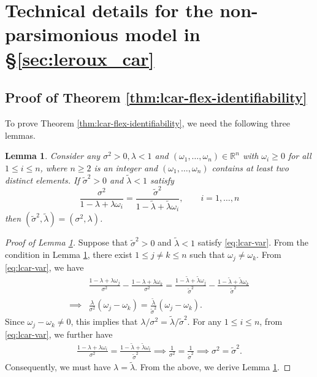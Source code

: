 \documentclass[11pt]{article}
\newtheorem{lemma}{Lemma}
\theoremstyle{definition}
\theoremstyle{remark}
\begin{document}
\section{Technical details for the non-parsimonious model in \S \ref{sec:leroux_car}}\label{sec:proofs-lcar-nonpars}

\subsection{Proof of Theorem \ref{thm:lcar-flex-identifiability}}

To prove Theorem \ref{thm:lcar-flex-identifiability}, we need the following three lemmas. 

\begin{lemma}\label{lem:lcar-varz}
Consider any $\sigma^2 >0, \lambda < 1$ and $(\omega_1,\ldots,\omega_n) \in \mathbb{R}^n$ with $\omega_i \ge 0$ for all $1 \le i \le n$, where $n\ge 2$ is an integer and $(\omega_1,\ldots,\omega_n)$ contains at least two distinct elements. If $\tilde{\sigma}^2 >0$ and $\tilde{\lambda} < 1$ satisfy
\begin{equation}\label{eq:lcar-var}
\frac{\sigma^2}{1-\lambda + \lambda \omega_i} = \frac{\tilde{\sigma}^2}{1-\tilde{\lambda} + \tilde{\lambda}\omega_i}, \qquad i=1,\ldots, n
\end{equation} 
then $(\tilde{\sigma}^2, \tilde{\lambda}) = (\sigma^2, \lambda)$.  
\end{lemma}
\begin{proof}[Proof of Lemma \ref{lem:lcar-varz}]
Suppose that $\tilde{\sigma}^2 >0$ and $\tilde{\lambda} < 1$ satisfy \eqref{eq:lcar-var}. 
From the condition in Lemma \ref{lem:lcar-varz}, there exist $1 \le j \neq k \le n$ such that $\omega_j \neq \omega_k$. From \eqref{eq:lcar-var}, we have 
\begin{align*}
& \frac{1-\lambda +\lambda \omega_j}{\sigma^2} - \frac{1-\lambda + \lambda \omega_k}{\sigma^2} = \frac{1-\tilde{\lambda} + \tilde{\lambda}\omega_j}{\tilde{\sigma}^2} - \frac{1-\tilde\lambda + \tilde\lambda \omega_k}{\tilde{\sigma}^2}\\
\implies 
& 
\frac{\lambda}{\sigma^2}(\omega_j-\omega_k) 
=
\frac{\tilde\lambda}{\tilde{\sigma}^2}(\omega_j-\omega_k). \end{align*}
Since $\omega_j-\omega_k \neq 0$, this implies that $\lambda/\sigma^2 = \tilde\lambda / \tilde{\sigma}^2$.
For any $1\le i \le n$, from \eqref{eq:lcar-var}, we further have 
\begin{align*}
    \frac{1-\lambda +\lambda \omega_i}{\sigma^2}  = \frac{1-\tilde{\lambda} + \tilde{\lambda}\omega_i}{\tilde{\sigma}^2} 
    \implies
    \frac{1}{\sigma^2} = \frac{1}{\tilde{\sigma}^2}
    \implies 
    \sigma^2 = \tilde{\sigma}^2. 
\end{align*}
Consequently, we must have $\lambda = \tilde\lambda$. 
From the above, we derive Lemma \ref{lem:lcar-varz}. 
\end{proof}
\end{document}
